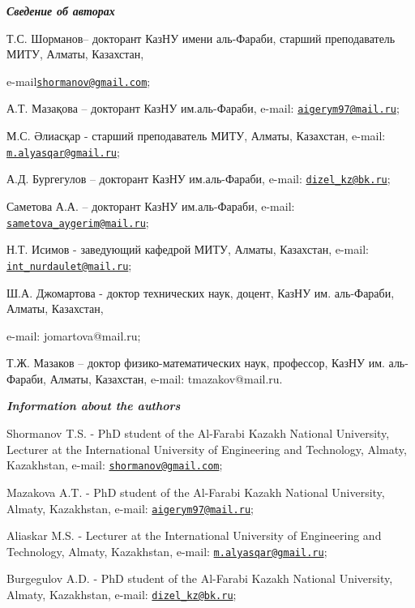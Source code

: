 \begin{authorinfo}
\hspace{1em}\emph{{\bfseries Сведение об авторах}}

Т.С. Шорманов-- докторант КазНУ имени аль-Фараби, старший преподаватель
МИТУ, Алматы, Казахстан,

e-mail\href{mailto:shormanov@gmail.com}{\nolinkurl{shormanov@gmail.com}};

А.Т. Мазақова -- докторант КазНУ им.аль-Фараби, e-mail:
\href{mailto:aigerym97@mail.ru}{\nolinkurl{aigerym97@mail.ru}};

М.С. Әлиасқар - старший преподаватель МИТУ, Алматы, Казахстан, e-mail:
\href{mailto:m.alyasqar@gmail.ru}{\nolinkurl{m.alyasqar@gmail.ru}};

А.Д. Бургегулов -- докторант КазНУ им.аль-Фараби, e-mail:
\href{mailto:dizel_kz@bk.ru}{\nolinkurl{dizel\_kz@bk.ru}};

Саметова А.А. -- докторант КазНУ им.аль-Фараби, e-mail:
\href{mailto:sametova_aygerim@mail.ru}{\nolinkurl{sametova\_aygerim@mail.ru}};

Н.Т. Исимов - заведующий кафедрой МИТУ, Алматы, Казахстан, e-mail:
\href{mailto:int_nurdaulet@mail.ru}{\nolinkurl{int\_nurdaulet@mail.ru}};

Ш.А. Джомартова - доктор технических наук, доцент, КазНУ им. аль-Фараби,
Алматы, Казахстан,

e-mail: jomartova@mail.ru;

Т.Ж. Мазаков -- доктор физико-математических наук, профессор, КазНУ им.
аль-Фараби, Алматы, Казахстан, e-mail: tmazakov@mail.ru.

\hspace{1em}\emph{{\bfseries Information about the authors}}

Shormanov T.S. - PhD student of the Al-Farabi Kazakh National
University, Lecturer at the International University of Engineering and
Technology, Almaty, Kazakhstan, e-mail:
\href{mailto:shormanov@gmail.com}{\nolinkurl{shormanov@gmail.com}};

Mazakova A.T. - PhD student of the Al-Farabi Kazakh National University,
Almaty, Kazakhstan, e-mail:
\href{mailto:aigerym97@mail.ru}{\nolinkurl{aigerym97@mail.ru}};

Aliaskar M.S. - Lecturer at the International University of Engineering
and Technology, Almaty, Kazakhstan, e-mail:
\href{mailto:m.alyasqar@gmail.ru}{\nolinkurl{m.alyasqar@gmail.ru}};

Burgegulov A.D. - PhD student of the Al-Farabi Kazakh National
University, Almaty, Kazakhstan, e-mail:
\href{mailto:dizel_kz@bk.ru}{\nolinkurl{dizel\_kz@bk.ru}};


\end{authorinfo}
